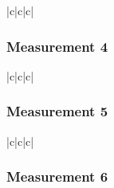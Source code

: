 \documentclass[a4paper]{article}
\makeatletter
\let\mcnewpage=\newpage
\newcommand{\TrickSupertabularIntoMulticols}{%
  \renewcommand\newpage{%
    \if@firstcolumn
      \hrule width\linewidth height0pt
      \columnbreak
    \else
      \mcnewpage
    \fi
  }%
}
\makeatother
\begin{document}
\begin{multicols}{3}

  \TrickSupertabularIntoMulticols

  \begin{supertabular}{|c|c|c|}
  \end{supertabular}

\end{multicols}

\pagebreak

\subsubsection*{Measurement 4}

\begin{multicols}{3}

  \TrickSupertabularIntoMulticols

  \begin{supertabular}{|c|c|c|}
  \end{supertabular}

\end{multicols}

\pagebreak

\subsubsection*{Measurement 5}

\begin{multicols}{3}

  \TrickSupertabularIntoMulticols

  \begin{supertabular}{|c|c|c|}
  \end{supertabular}

\end{multicols}

\pagebreak

\subsubsection*{Measurement 6}
\end{document}
